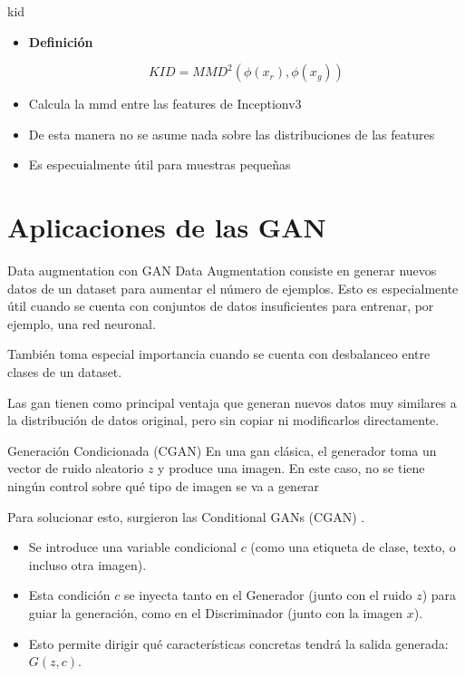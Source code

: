 \begin{frame}{\gls{kid} \cite{binkowski2018demystifying}}
\begin{itemize}
    \item \alert{\textbf{Definición}}

    \begin{equation}
        KID=MMD^2(\phi(x_r),\phi(x_g))
    \end{equation}
    
    \item Calcula la \gls{mmd} entre las features de Inceptionv3
    \item De esta manera no se \alert{asume} nada sobre las distribuciones de las features
    \item Es especuialmente útil para muestras pequeñas
\end{itemize}
\end{frame}

\section{Aplicaciones de las GAN}

\begin{frame}{Data augmentation con GAN}
Data Augmentation consiste en generar \alert{nuevos datos} de un dataset para aumentar el número de ejemplos. Esto es especialmente útil cuando se cuenta con conjuntos de datos \alert{insuficientes} para entrenar, por ejemplo, una red neuronal.

También toma especial importancia cuando se cuenta con \alert{desbalanceo} entre clases de un dataset.

Las \gls{gan} tienen como principal ventaja que generan nuevos datos muy similares a la distribución de datos original, pero sin copiar ni modificarlos directamente.
\end{frame}

\begin{frame}{Generación Condicionada (CGAN)}
En una \gls{gan} clásica, el generador toma un vector de ruido aleatorio $z$ y produce una imagen. En este caso, no se tiene \alert{ningún control} sobre qué tipo de imagen se va a generar

Para solucionar esto, surgieron las \alert{Conditional GANs (CGAN)} \cite{mirza2014conditional}.
\begin{itemize}
    \item Se introduce una variable condicional \alert{$c$} (como una etiqueta de clase, texto, o incluso otra imagen).
    \item Esta condición $c$ se inyecta tanto en el \alert{Generador} (junto con el ruido $z$) para guiar la generación, como en el \alert{Discriminador} (junto con la imagen $x$).
    \item Esto permite \alert{dirigir} qué características concretas tendrá la salida generada: $G(z, c)$.
\end{itemize}
\end{frame}


